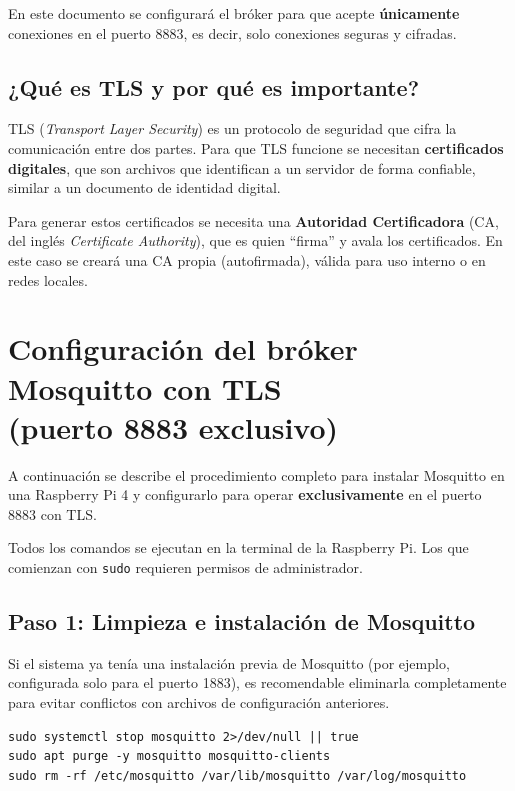 \documentclass[12pt,a4paper]{article}
\begin{document}
En este documento se configurará el bróker para que acepte \textbf{únicamente}
conexiones en el puerto 8883, es decir, solo conexiones seguras y cifradas.

\subsection{¿Qué es TLS y por qué es importante?}

TLS (\textit{Transport Layer Security}) es un protocolo de seguridad que cifra
la comunicación entre dos partes. Para que TLS funcione se necesitan
\textbf{certificados digitales}, que son archivos que identifican a un servidor
de forma confiable, similar a un documento de identidad digital.

Para generar estos certificados se necesita una \textbf{Autoridad Certificadora}
(CA, del inglés \textit{Certificate Authority}), que es quien ``firma'' y avala
los certificados. En este caso se creará una CA propia (autofirmada), válida
para uso interno o en redes locales.

\section{Configuración del bróker Mosquitto con TLS\\(puerto 8883 exclusivo)}

A continuación se describe el procedimiento completo para instalar Mosquitto en
una Raspberry Pi 4 y configurarlo para operar \textbf{exclusivamente} en el
puerto 8883 con TLS.

Todos los comandos se ejecutan en la terminal de la Raspberry Pi. Los que
comienzan con \texttt{sudo} requieren permisos de administrador.

\subsection{Paso 1: Limpieza e instalación de Mosquitto}

Si el sistema ya tenía una instalación previa de Mosquitto (por ejemplo,
configurada solo para el puerto 1883), es recomendable eliminarla
completamente para evitar conflictos con archivos de configuración anteriores.

\begin{lstlisting}[style=bash]
sudo systemctl stop mosquitto 2>/dev/null || true
sudo apt purge -y mosquitto mosquitto-clients
sudo rm -rf /etc/mosquitto /var/lib/mosquitto /var/log/mosquitto
\end{lstlisting}
\end{document}
